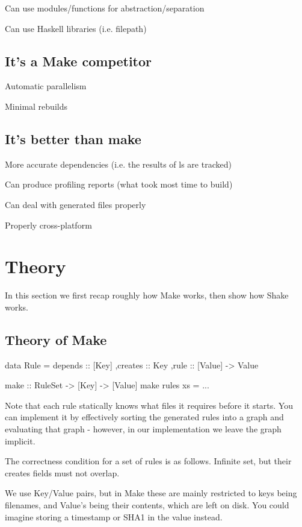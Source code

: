 \documentclass{sigplanconf}
\begin{document}
Can use modules/functions for abstraction/separation

Can use Haskell libraries (i.e. filepath)

\subsection{It's a Make competitor}

Automatic parallelism


Minimal rebuilds

\subsection{It's better than make}

More accurate dependencies (i.e. the results of ls are tracked)

Can produce profiling reports (what took most time to build)

Can deal with generated files properly

Properly cross-platform

\section{Theory}

In this section we first recap roughly how Make works, then show how Shake works.

\subsection{Theory of Make}

\begin{code}
data Rule =
    {depends :: [Key]
    ,creates :: Key
    ,rule :: [Value] -> Value
    }

make :: RuleSet -> [Key] -> [Value]
make rules xs = ...
\end{code}

Note that each rule statically knows what files it requires before it starts. You can implement it by effectively sorting the generated rules into a graph and evaluating that graph - however, in our implementation we leave the graph implicit.

The correctness condition for a set of rules is as follows. Infinite set, but their creates fields must not overlap.

We use Key/Value pairs, but in Make these are mainly restricted to keys being filenames, and Value's being their contents, which are left on disk. You could imagine storing a timestamp or SHA1 in the value instead.
\end{document}
